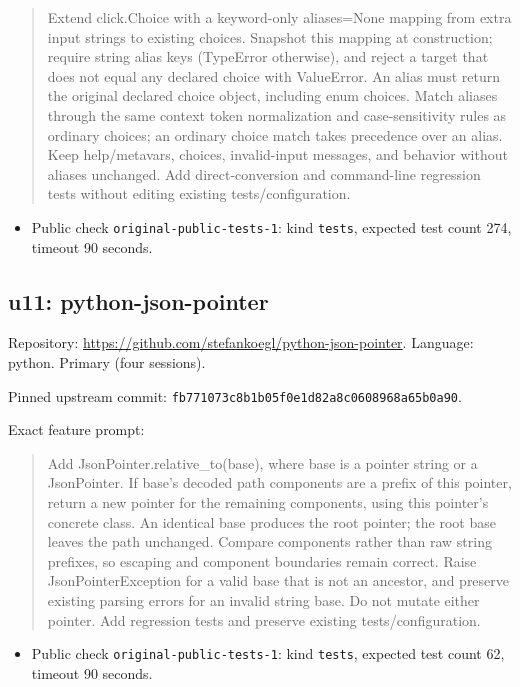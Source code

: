 \documentclass[manuscript,screen,nonacm]{acmart}
\providecommand{\tightlist}{\setlength{\itemsep}{0pt}\setlength{\parskip}{0pt}}
\begin{document}
\begin{quote}
Extend click.Choice with a keyword-only aliases=None mapping from extra
input strings to existing choices. Snapshot this mapping at
construction; require string alias keys (TypeError otherwise), and
reject a target that does not equal any declared choice with ValueError.
An alias must return the original declared choice object, including enum
choices. Match aliases through the same context token normalization and
case-sensitivity rules as ordinary choices; an ordinary choice match
takes precedence over an alias. Keep help/metavars, choices,
invalid-input messages, and behavior without aliases unchanged. Add
direct-conversion and command-line regression tests without editing
existing tests/configuration.
\end{quote}

\begin{itemize}
\tightlist
\item
  Public check \nolinkurl{original-public-tests-1}: kind \texttt{tests},
  expected test count 274, timeout 90 seconds.
\end{itemize}

\subsection{u11: python-json-pointer}\label{u11-python-json-pointer}

Repository: \url{https://github.com/stefankoegl/python-json-pointer}.
Language: python. Primary (four sessions).

Pinned upstream commit:
\nolinkurl{fb771073c8b1b05f0e1d82a8c0608968a65b0a90}.

Exact feature prompt:

\begin{quote}
Add JsonPointer.relative\_to(base), where base is a pointer string or a
JsonPointer. If base's decoded path components are a prefix of this
pointer, return a new pointer for the remaining components, using this
pointer's concrete class. An identical base produces the root pointer;
the root base leaves the path unchanged. Compare components rather than
raw string prefixes, so escaping and component boundaries remain
correct. Raise JsonPointerException for a valid base that is not an
ancestor, and preserve existing parsing errors for an invalid string
base. Do not mutate either pointer. Add regression tests and preserve
existing tests/configuration.
\end{quote}

\begin{itemize}
\tightlist
\item
  Public check \nolinkurl{original-public-tests-1}: kind \texttt{tests},
  expected test count 62, timeout 90 seconds.
\end{itemize}
\end{document}
